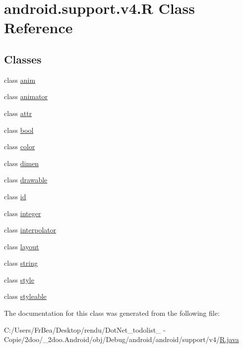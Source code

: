 \hypertarget{classandroid_1_1support_1_1v4_1_1_r}{
\section{android.support.v4.R Class Reference}
\label{classandroid_1_1support_1_1v4_1_1_r}
}
\subsection*{Classes}
\begin{CompactItemize}
\item 
class \hyperlink{classandroid_1_1support_1_1v4_1_1_r_1_1anim}{anim}
\item 
class \hyperlink{classandroid_1_1support_1_1v4_1_1_r_1_1animator}{animator}
\item 
class \hyperlink{classandroid_1_1support_1_1v4_1_1_r_1_1attr}{attr}
\item 
class \hyperlink{classandroid_1_1support_1_1v4_1_1_r_1_1bool}{bool}
\item 
class \hyperlink{classandroid_1_1support_1_1v4_1_1_r_1_1color}{color}
\item 
class \hyperlink{classandroid_1_1support_1_1v4_1_1_r_1_1dimen}{dimen}
\item 
class \hyperlink{classandroid_1_1support_1_1v4_1_1_r_1_1drawable}{drawable}
\item 
class \hyperlink{classandroid_1_1support_1_1v4_1_1_r_1_1id}{id}
\item 
class \hyperlink{classandroid_1_1support_1_1v4_1_1_r_1_1integer}{integer}
\item 
class \hyperlink{classandroid_1_1support_1_1v4_1_1_r_1_1interpolator}{interpolator}
\item 
class \hyperlink{classandroid_1_1support_1_1v4_1_1_r_1_1layout}{layout}
\item 
class \hyperlink{classandroid_1_1support_1_1v4_1_1_r_1_1string}{string}
\item 
class \hyperlink{classandroid_1_1support_1_1v4_1_1_r_1_1style}{style}
\item 
class \hyperlink{classandroid_1_1support_1_1v4_1_1_r_1_1styleable}{styleable}
\end{CompactItemize}


The documentation for this class was generated from the following file:\begin{CompactItemize}
\item 
C:/Users/FrBea/Desktop/rendu/DotNet\_\-todolist\_ - Copie/2doo/\_\-2doo.Android/obj/Debug/android/android/support/v4/\hyperlink{android_2support_2v4_2_r_8java}{R.java}\end{CompactItemize}
